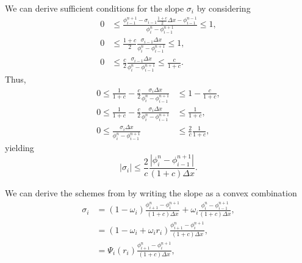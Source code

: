 \documentclass[../thesis.tex]{subfiles}
\begin{document}
We can derive sufficient conditions for the slope \(\sigma_{i}\) by considering
\begin{equation}
    \begin{split}
        0
        &\leq
        \frac{\phi_{i-1}^{n+1}
        -\sigma_{i-1}\frac{1+c}{2}\Delta x
        - \phi_{i-1}^{n-1}}{\phi_{i}^{n} - \phi_{i-1}^{n+1}}
        \leq
        1,
        \\
        0
        &\leq
        \frac{1+c}{2}
        \frac{\sigma_{i-1}\Delta x}
        {\phi_{i}^{n} - \phi_{i-1}^{n+1}}
        \leq
        1,
        \\
        0
        &\leq
        \frac{c}{2}
        \frac{\sigma_{i-1}\Delta x}
        {\phi_{i}^{n} - \phi_{i-1}^{n+1}}
        \leq
        \frac{c}{1+c}.
    \end{split}
\end{equation}
Thus,
\begin{equation}
    \begin{split}
        0
        \leq
        \frac{1}{1+c}
        -\frac{c}{2}
        \frac{\sigma_{i}\Delta x}
        {\phi_{i}^{n} - \phi_{i-1}^{n+1}}
        &\leq
        1 - \frac{c}{1+c},
        \\
        0
        \leq
        \frac{1}{1+c}
        -\frac{c}{2}
        \frac{\sigma_{i}\Delta x}
        {\phi_{i}^{n} - \phi_{i-1}^{n+1}}
        &\leq
        \frac{1}{1+c},
        \\
        0
        \leq
        \frac{\sigma_{i}\Delta x}
        {\phi_{i}^{n} - \phi_{i-1}^{n+1}}
        &\leq
        \frac{2}{c}
        \frac{1}{1+c},
    \end{split}
\end{equation}
yielding
\begin{equation}
    |\sigma_{i}|
        \leq
        \frac{2}{c}
        \frac{|\phi_{i}^{n} - \phi_{i-1}^{n+1}|}
        {(1+c)\Delta x}.
\end{equation}
\begin{remark}
    We can derive the schemes from \cite{2023_Frolkovic} by writing the slope as a convex combination
    \begin{equation}
        \begin{split}
            \sigma_{i} &=
            (1-\omega_{i})
            \frac{\phi_{i+1}^{n}-\phi_{i}^{n+1}}
            {(1+c)\Delta x}
            + \omega_{i}
            \frac{\phi_{i}^{n} - \phi_{i-1}^{n+1}}
            {(1+c)\Delta x},
            \\
            &=
            \left( 1 - \omega_{i} + \omega_{i}r_i \right)
            \frac{\phi_{i+1}^{n}-\phi_{i}^{n+1}}
            {(1+c)\Delta x},
            \\
            &=
            \Psi_{i}(r_{i})
            \frac{\phi_{i+1}^{n}-\phi_{i}^{n+1}}
            {(1+c)\Delta x},
        \end{split}
    \end{equation}
\end{remark}
\end{document}
